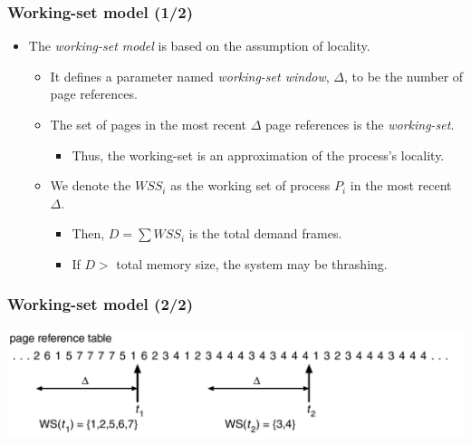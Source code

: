 \documentclass[CJKutf8,xcolor=pdftex,dvipsnames,table]{beamer}
\begin{document}
\begin{CJK*}{UTF8}{song}
  \begin{frame}
    \frametitle{Working-set model (1/2)} \pause
    \begin{itemize}
    \item{The \emph{working-set model} is based on the assumption of locality.} \pause
      \begin{itemize}
      \item{It defines a parameter named \emph{working-set window}, $\Delta$, to be the number of page references.} \pause
      \item{The set of pages in the most recent $\Delta$ page references is the \emph{working-set}.} \pause
        \begin{itemize}
        \item{Thus, the working-set is an approximation of the process's locality.} \pause
        \end{itemize}
      \item{We denote the $WSS_i$ as the working set of process $P_i$ in the most recent $\Delta$.} \pause
        \begin{itemize}
        \item{Then, $D=\sum{WSS_i}$ is the total demand frames.} \pause
        \item{If $D >$ total memory size, the system may be thrashing.}
        \end{itemize}
      \end{itemize}
    \end{itemize}
  \end{frame}
  
  \begin{frame}
    \frametitle{Working-set model (2/2)} \pause
    \begin{center}
      \includegraphics[scale=0.4]{v6f10-17}
    \end{center}
  \end{frame}
  

\end{CJK*}
\end{document}

